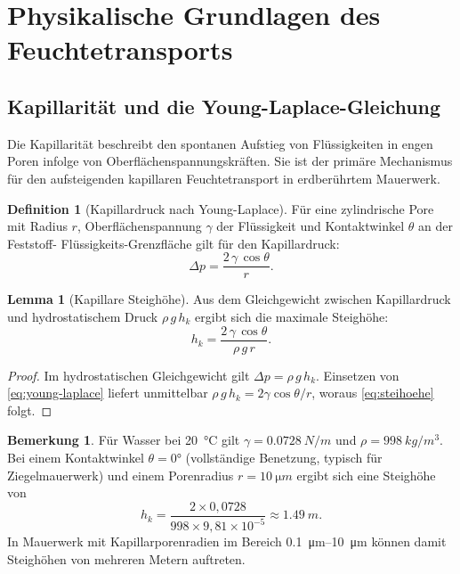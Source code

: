 ﻿\documentclass[a4paper,12pt]{article}
\theoremstyle{definition}
\newtheorem{lemma}[theorem]{Lemma}
\newtheorem{definition}[theorem]{Definition}
\newtheorem{bemerkung}[theorem]{Bemerkung}
\begin{document}
\section{Physikalische Grundlagen des Feuchtetransports}
\label{sec:grundlagen}

\subsection{Kapillarit\"at und die Young-Laplace-Gleichung}

Die Kapillarit\"at beschreibt den spontanen Aufstieg von Fl\"ussigkeiten
in engen Poren infolge von Oberfl\"achenspannungskr\"aften. Sie ist der
prim\"are Mechanismus f\"ur den aufsteigenden kapillaren Feuchtetransport
in erdber\"uhrtem Mauerwerk.

\begin{definition}[Kapillardruck nach Young-Laplace]
\label{def:young-laplace}
F\"ur eine zylindrische Pore mit Radius $r$, Oberfl\"achenspannung
$\gamma$ der Fl\"ussigkeit und Kontaktwinkel $\theta$ an der Feststoff-
Fl\"ussigkeits-Grenzfl\"ache gilt f\"ur den Kapillardruck:
\begin{equation}
  \Delta p = \frac{2\,\gamma\,\cos\theta}{r}.
  \label{eq:young-laplace}
\end{equation}
\end{definition}

\begin{lemma}[Kapillare Steigh\"ohe]
\label{lem:steihoehe}
Aus dem Gleichgewicht zwischen Kapillardruck und hydrostatischem Druck
$\rho\,g\,h_k$ ergibt sich die maximale Steigh\"ohe:
\begin{equation}
  h_k = \frac{2\,\gamma\,\cos\theta}{\rho\,g\,r}.
  \label{eq:steihoehe}
\end{equation}
\end{lemma}

\begin{proof}
Im hydrostatischen Gleichgewicht gilt $\Delta p = \rho\,g\,h_k$.
Einsetzen von \cref{eq:young-laplace} liefert unmittelbar
$\rho\,g\,h_k = 2\gamma\cos\theta/r$, woraus
\cref{eq:steihoehe} folgt. 
\end{proof}

\begin{bemerkung}
F\"ur Wasser bei \SI{20}{\celsius} gilt $\gamma = \SI{0.0728}{N/m}$
und $\rho = \SI{998}{kg/m^3}$. Bei einem Kontaktwinkel $\theta = 0 °$
(vollst\"andige Benetzung, typisch f\"ur Ziegelmauerwerk) und einem
Porenradius $r = \SI{10}{\micro m}$ ergibt sich eine Steigh\"ohe von
\begin{equation*}
  h_k = \frac{2 \times 0{,}0728}{998 \times 9{,}81 \times 10^{-5}}
      \approx \SI{1.49}{m}.
\end{equation*}
In Mauerwerk mit Kapillarporenradien im Bereich \SIrange{0.1}{10}{\micro m}
k\"onnen damit Steigh\"ohen von mehreren Metern auftreten.
\end{bemerkung}
\end{document}
